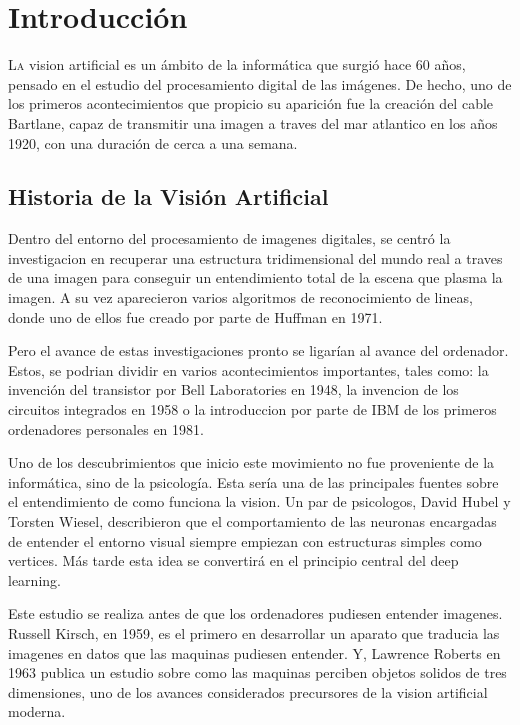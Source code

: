 
\chapter{Introducción}

\lettrine[lines=4]{L}{a} vision artificial  es un ámbito de la informática que surgió hace 60 años, pensado en el estudio del procesamiento digital de las imágenes. De hecho, uno de los primeros acontecimientos que propicio su aparición fue la creación del cable Bartlane, capaz de transmitir una imagen a traves del mar atlantico en los años 1920, con una duración de cerca a una semana.

\section{Historia de la Visión Artificial}

Dentro del entorno del procesamiento de imagenes digitales, se centró la investigacion en recuperar una estructura tridimensional del mundo real a traves de una imagen para conseguir un entendimiento total de la escena que plasma la imagen. A su vez aparecieron varios algoritmos de reconocimiento de lineas, donde uno de ellos fue creado por parte de Huffman en 1971.

Pero el avance de estas investigaciones pronto se ligarían al avance del ordenador. Estos, se podrian dividir en varios acontecimientos importantes, tales como: la invención del transistor por Bell Laboratories en 1948, la invencion de los circuitos integrados en 1958 o la introduccion por parte de IBM de los primeros ordenadores personales en 1981.

Uno de los descubrimientos que inicio este movimiento no fue proveniente de la informática, sino de la psicología. Esta sería una de las principales fuentes sobre el entendimiento de como funciona la vision.  Un par de psicologos, David Hubel y Torsten Wiesel, describieron que el comportamiento de las neuronas encargadas de entender el entorno visual siempre empiezan con estructuras simples como vertices. Más tarde esta idea se convertirá en el principio central del deep learning.

Este estudio se realiza antes de que los ordenadores pudiesen entender imagenes. Russell Kirsch, en 1959, es el primero en desarrollar un aparato que traducia las imagenes en datos que las maquinas pudiesen entender.  Y, Lawrence Roberts en 1963 publica un estudio sobre como las maquinas perciben objetos solidos de tres dimensiones, uno de los avances considerados precursores de la vision artificial moderna.

